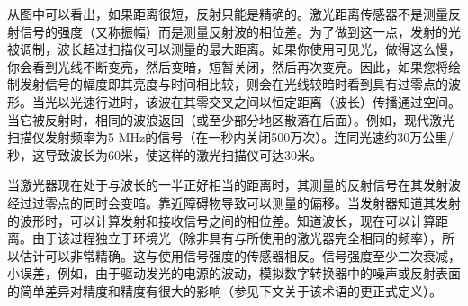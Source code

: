 


从图中可以看出，如果距离很短，反射只能是精确的。激光距离传感器不是测量反射信号的强度（又称振幅）而是测量反射波的相位差。为了做到这一点，发射的光被调制，波长超过扫描仪可以测量的最大距离。如果你使用可见光，做得这么慢，你会看到光线不断变亮，然后变暗，短暂关闭，然后再次变亮。因此，如果您将绘制发射信号的幅度即其亮度与时间相比较，则会在光线较暗时看到具有过零点的波形。当光以光速行进时，该波在其零交叉之间以恒定距离（波长）传播通过空间。当它被反射时，相同的波浪返回（或至少部分地区散落在后面）。例如，现代激光扫描仪发射频率为5 MHz的信号（在一秒内关闭500万次）。连同光速约30万公里/秒，这导致波长为60米，使这样的激光扫描仪可达30米。

当激光器现在处于与波长的一半正好相当的距离时，其测量的反射信号在其发射波经过过零点的同时会变暗。靠近障碍物导致可以测量的偏移。当发射器知道其发射的波形时，可以计算发射和接收信号之间的相位差。知道波长，现在可以计算距离。由于该过程独立于环境光（除非具有与所使用的激光器完全相同的频率），所以估计可以非常精确。这与使用信号强度的传感器相反。信号强度至少二次衰减，小误差，例如，由于驱动发光的电源的波动，模拟数字转换器中的噪声或反射表面的简单差异对精度和精度有很大的影响（参见下文关于该术语的更正式定义）。

